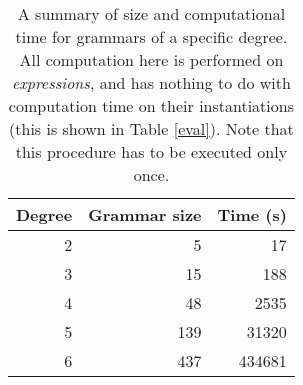 \begin{table}[t]
\tiny
\centering
\begin{tabular}{rrr}
\hline
Degree & Grammar size & Time (s) \\
\hline
2 & 5 & 17 \\
3 & 15 & 188 \\
4 & 48 & 2535\\
5 & 139 & 31320 \\
6 & 437 & 434681 \\
\hline
\end{tabular}
\caption{A summary of size and computational time for grammars of a specific degree. 
  All computation here is performed on {\em expressions}, and has
  nothing to do with computation time on their instantiations (this is
  shown in Table \ref{eval}). Note that this procedure has to be executed only once.}
\label{grammars}
\vspace{-4mm}
\end{table}



